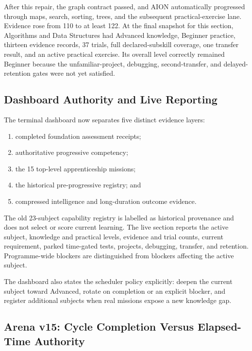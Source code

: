 After this repair, the graph contract passed, and AION automatically progressed
through maps, search, sorting, trees, and the subsequent practical-exercise
lane.  Evidence rose from 110 to at least 122.  At the final snapshot for this
section, Algorithms and Data Structures had Advanced knowledge, Beginner
practice, thirteen evidence records, 37 trials, full declared-subskill
coverage, one transfer result, and an active practical exercise.  Its overall
level correctly remained Beginner because the unfamiliar-project, debugging,
second-transfer, and delayed-retention gates were not yet satisfied.

\subsection{Dashboard Authority and Live Reporting}
\label{subsec:aion-dashboard-authority}

The terminal dashboard now separates five distinct evidence layers:
\begin{enumerate}
    \item completed foundation assessment receipts;
    \item authoritative progressive competency;
    \item the 15 top-level apprenticeship missions;
    \item the historical pre-progressive registry; and
    \item compressed intelligence and long-duration outcome evidence.
\end{enumerate}
The old 23-subject capability registry is labelled as historical provenance and
does not select or score current learning.  The live section reports the active
subject, knowledge and practical levels, evidence and trial counts, current
requirement, parked time-gated tests, projects, debugging, transfer, and
retention.  Programme-wide blockers are distinguished from blockers affecting
the active subject.

The dashboard also states the scheduler policy explicitly: deepen the current
subject toward Advanced, rotate on completion or an explicit blocker, and
register additional subjects when real missions expose a new knowledge gap.

\subsection{Arena v15: Cycle Completion Versus Elapsed-Time Authority}
\label{subsec:aion-arena-v15-time-gate}


